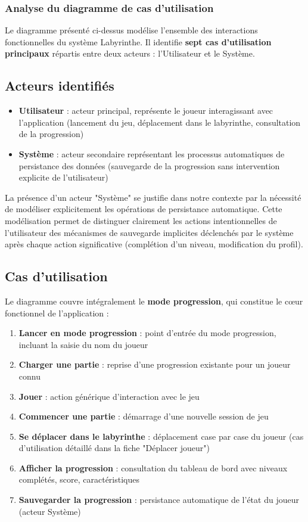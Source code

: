 \documentclass{butexFR}
\begin{document}
\subsubsection{Analyse du diagramme de cas d'utilisation}

Le diagramme présenté ci-dessus modélise l'ensemble des interactions fonctionnelles du système Labyrinthe. Il identifie \textbf{sept cas d'utilisation principaux} répartis entre deux acteurs : l'Utilisateur et le Système.

\subsection{Acteurs identifiés}

\begin{itemize}
    \item \textbf{Utilisateur} : acteur principal, représente le joueur interagissant avec l'application (lancement du jeu, déplacement dans le labyrinthe, consultation de la progression)
    \item \textbf{Système} : acteur secondaire représentant les processus automatiques de persistance des données (sauvegarde de la progression sans intervention explicite de l'utilisateur)
\end{itemize}

La présence d'un acteur "Système" se justifie dans notre contexte par la nécessité de modéliser explicitement les opérations de persistance automatique. Cette modélisation permet de distinguer clairement les actions intentionnelles de l'utilisateur des mécanismes de sauvegarde implicites déclenchés par le système après chaque action significative (complétion d'un niveau, modification du profil).

\subsection{Cas d'utilisation}

Le diagramme couvre intégralement le \textbf{mode progression}, qui constitue le cœur fonctionnel de l'application :

\begin{enumerate}
    \item \textbf{Lancer en mode progression} : point d'entrée du mode progression, incluant la saisie du nom du joueur
    \item \textbf{Charger une partie} : reprise d'une progression existante pour un joueur connu
    \item \textbf{Jouer} : action générique d'interaction avec le jeu
    \item \textbf{Commencer une partie} : démarrage d'une nouvelle session de jeu
    \item \textbf{Se déplacer dans le labyrinthe} : déplacement case par case du joueur (cas d'utilisation détaillé dans la fiche "Déplacer joueur")
    \item \textbf{Afficher la progression} : consultation du tableau de bord avec niveaux complétés, score, caractéristiques
    \item \textbf{Sauvegarder la progression} : persistance automatique de l'état du joueur (acteur Système)
\end{enumerate}
\end{document}

